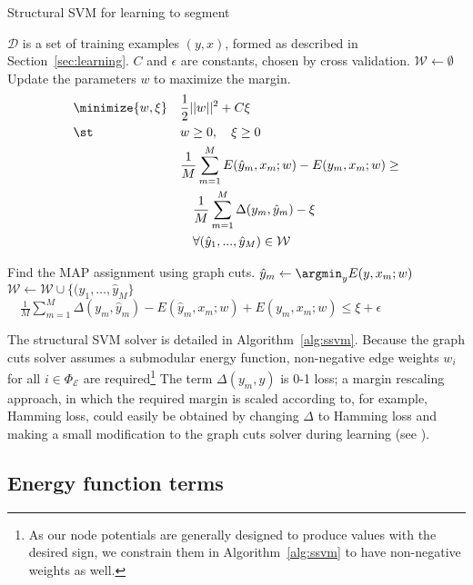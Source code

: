 \documentclass[conference]{IEEEtran}
\begin{document}
\begin{algorithm}[h]
  \caption{Structural SVM for learning to segment}
  \label{alg:ssvm}
  \begin{algorithmic}
    \STATE $\mathcal{D}$ is a set of training examples $(y, x)$,                             formed as described in Section~\ref{sec:learning}.
\STATE $C$ and $\epsilon$ are constants, chosen by cross validation.
\STATE 
\STATE $\mathcal{W} \leftarrow \emptyset$
\REPEAT
\STATE Update the parameters $w$ to maximize the margin.
\begin{equation*}
  \begin{aligned}
    & \minimize{w, \xi} & & \frac{1}{2} ||w||^2 + C\xi \\
    & \st & & w \geq 0, \quad \xi \geq 0 \\
    & & & \frac{1}{M} \sum_{m=1}^M E ( \hat{y}_m, x_m; w )
    - E ( y_m, x_m; w ) \geq \\
    & & & \quad \frac{1}{M} \sum_{m=1}^M \Delta(y_m, \hat{y}_m) - \xi \\
    & & & \quad \forall (\hat{y}_1, ..., \hat{y}_M) \in \mathcal{W}
  \end{aligned}
\end{equation*}

\STATE Find the MAP assignment using graph cuts.
\STATE $\hat{y}_m \leftarrow \argmin_y E (y, x_m; w )$
\ENDFOR
\STATE $\mathcal{W} \leftarrow \mathcal{W} \cup \{(\hat{y}_1, \dots, \hat{y}_M\}$
\UNTIL
\STATE $\quad \frac{1}{M} \sum_{m = 1}^M \Delta(y_m, \hat{y}_m) - E ( \hat{y}_m, x_m; w) + E ( y_m, x_m; w ) \leq \xi + \epsilon$
  \end{algorithmic}
\end{algorithm}

The structural SVM solver is detailed in Algorithm~\ref{alg:ssvm}.  Because the graph cuts solver assumes a submodular energy function, non-negative edge weights $w_i$ for all $i \in \Phi_{\mathcal{E}}$ are required\footnote{As our node potentials are generally designed to produce values with the desired sign, we constrain them in Algorithm~\ref{alg:ssvm} to have non-negative weights as well.}  The term $\Delta (y_m, y)$ is 0-1 loss; a margin rescaling approach, in which the required margin is scaled according to, for example, Hamming loss, could easily be obtained by changing $\Delta$ to Hamming loss and making a small modification to the graph cuts solver during learning (see \cite{szummer2008a}). 


\subsection{Energy function terms}
\label{sec:energy}
\end{document}
